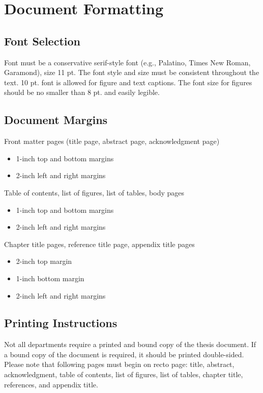 \chapter{Document Formatting}
\label{ap:formatting}

\section{Font Selection}
	Font must be a conservative serif-style font (e.g., Palatino, Times New Roman, Garamond), size 11 pt. The font style and size must be consistent throughout the text. 10 pt. font is allowed for figure and text captions. The font size for figures should be no smaller than 8 pt. and easily legible.

	\section{Document Margins}
	Front matter pages (title page, abstract page, acknowledgment page)
	\begin{itemize}
		\item 1-inch top and bottom margins
		\item 2-inch left and right margins
	\end{itemize}

	\noindent Table of contents, list of figures, list of tables, body pages
	\begin{itemize}
		\item 1-inch top and bottom margins
		\item 2-inch left and right margins
	\end{itemize}

	\noindent Chapter title pages, reference title page, appendix title pages
	\begin{itemize}
		\item 2-inch top margin
		\item 1-inch bottom margin
		\item 2-inch left and right margins
	\end{itemize}

	\section{Printing Instructions}
	Not all departments require a printed and bound copy of the thesis document. If a bound copy of the document is required, it should be printed double-sided. Please note that following pages must begin on recto page: title, abstract, acknowledgment, table of contents, list of figures, list of tables, chapter title, references, and appendix title.

